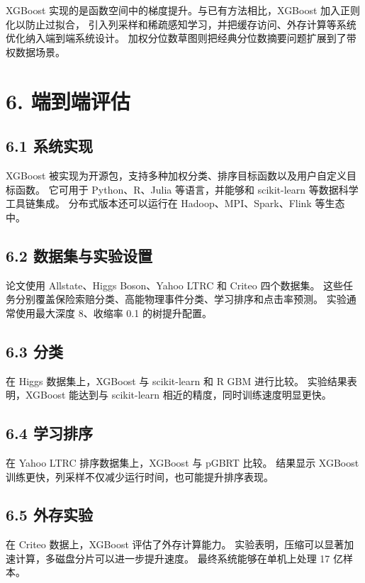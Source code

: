 XGBoost 实现的是函数空间中的梯度提升。与已有方法相比，XGBoost 加入正则化以防止过拟合，
引入列采样和稀疏感知学习，并把缓存访问、外存计算等系统优化纳入端到端系统设计。
加权分位数草图则把经典分位数摘要问题扩展到了带权数据场景。

\section{6. 端到端评估}

\subsection{6.1 系统实现}

XGBoost 被实现为开源包，支持多种加权分类、排序目标函数以及用户自定义目标函数。
它可用于 Python、R、Julia 等语言，并能够和 scikit-learn 等数据科学工具链集成。
分布式版本还可以运行在 Hadoop、MPI、Spark、Flink 等生态中。

\subsection{6.2 数据集与实验设置}

论文使用 Allstate、Higgs Boson、Yahoo LTRC 和 Criteo 四个数据集。
这些任务分别覆盖保险索赔分类、高能物理事件分类、学习排序和点击率预测。
实验通常使用最大深度 8、收缩率 0.1 的树提升配置。

\subsection{6.3 分类}

在 Higgs 数据集上，XGBoost 与 scikit-learn 和 R GBM 进行比较。
实验结果表明，XGBoost 能达到与 scikit-learn 相近的精度，同时训练速度明显更快。

\subsection{6.4 学习排序}

在 Yahoo LTRC 排序数据集上，XGBoost 与 pGBRT 比较。
结果显示 XGBoost 训练更快，列采样不仅减少运行时间，也可能提升排序表现。

\subsection{6.5 外存实验}

在 Criteo 数据上，XGBoost 评估了外存计算能力。
实验表明，压缩可以显著加速计算，多磁盘分片可以进一步提升速度。
最终系统能够在单机上处理 17 亿样本。

